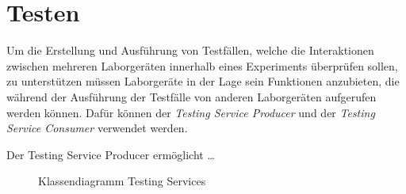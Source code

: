 \section{Testen}\label{section:konzeption:testen}

Um die Erstellung und Ausführung von Testfällen, welche die Interaktionen zwischen mehreren Laborgeräten innerhalb eines Experiments überprüfen sollen, zu unterstützen müssen Laborgeräte in der Lage sein Funktionen anzubieten, die während der Ausführung der Testfälle von anderen Laborgeräten aufgerufen werden können. Dafür können der \textit{Testing Service Producer} und der \textit{Testing Service Consumer} verwendet werden.

Der Testing Service Producer ermöglicht \dots

\begin{figure}[tbp]
    \centering
    \caption{Klassendiagramm Testing Services}
    \label{figure:klassendiagramm-testing-services}
\end{figure}